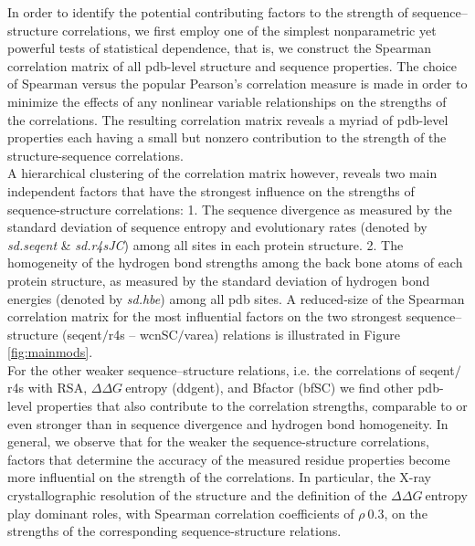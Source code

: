 \documentclass[11pt]{article}
\newcommand{\ddg}{$\Delta\Delta G~$}
\begin{document}
        In order to identify the potential contributing factors to the strength of sequence--structure correlations, we first employ one of the simplest nonparametric yet powerful tests of statistical dependence, that is, we construct the Spearman correlation matrix of all pdb-level structure and sequence properties. The choice of Spearman versus the popular Pearson's correlation measure is made in order to minimize the effects of any nonlinear variable relationships on the strengths of the correlations.  The resulting correlation matrix reveals a myriad of pdb-level properties each having a small but nonzero contribution to the strength of the structure-sequence correlations.
        \\

        A hierarchical clustering of the correlation matrix however, reveals two main independent factors that have the strongest influence on the strengths of sequence-structure correlations: 1. The sequence divergence as measured by the standard deviation of sequence entropy and evolutionary rates (denoted by {\it sd.seqent} \& {\it sd.r4sJC}) among all sites in each protein structure.   2. The homogeneity of the hydrogen bond strengths among the back bone atoms of each protein structure, as measured by the standard deviation of hydrogen bond energies (denoted by {\it sd.hbe}) among all pdb sites.   A reduced-size of the Spearman correlation matrix for the most influential factors on the two strongest sequence--structure (seqent$/$r4s -- wcnSC$/$varea) relations is illustrated in Figure \ref{fig:mainmods}.
        \\

        For the other weaker sequence--structure relations, i.e. the correlations of seqent$/$r4s with RSA, \ddg entropy (ddgent), and Bfactor (bfSC) we find other pdb-level properties that also contribute to the correlation strengths, comparable to or even stronger than in sequence divergence and hydrogen bond homogeneity. In general, we observe that for the weaker the sequence-structure correlations, factors that determine the accuracy of the measured residue properties become more influential on the strength of the correlations. In particular, the X-ray crystallographic resolution of the structure and the definition of the \ddg entropy play dominant roles, with Spearman correlation coefficients of $\rho~0.3$, on the strengths of the corresponding sequence-structure relations.
        \\
\end{document}
